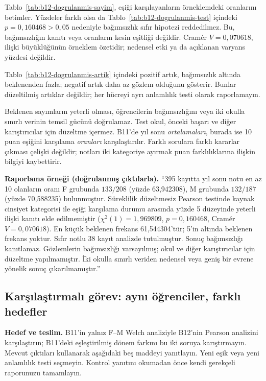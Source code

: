 \begin{outputguidebox}
Tablo~\ref{tab:b12-dogrulanmis-sayim}, eşiği karşılayanların
örneklemdeki oranlarını betimler. Yüzdeler farklı olsa da
Tablo~\ref{tab:b12-dogrulanmis-test} içindeki
$p=0{,}160468>0{,}05$ nedeniyle bağımsızlık sıfır hipotezi
reddedilmez. Bu, bağımsızlığın kanıtı veya oranların kesin eşitliği
değildir. Cramér $V=0{,}070618$, ilişki büyüklüğünün örneklem
özetidir; nedensel etki ya da açıklanan varyans yüzdesi değildir.

Tablo~\ref{tab:b12-dogrulanmis-artik} içindeki pozitif artık,
bağımsızlık altında beklenenden fazla; negatif artık daha az
gözlem olduğunu gösterir. Bunlar düzeltilmiş artıklar değildir;
her hücreyi ayrı anlamlılık testi olarak raporlamayın.

Beklenen sayımların yeterli olması, öğrencilerin bağımsızlığını
veya iki okulla sınırlı verinin temsil gücünü doğrulamaz. Test okul,
önceki başarı ve diğer karıştırıcılar için düzeltme içermez.
B11'de yıl sonu \emph{ortalamaları}, burada ise 10 puan eşiğini
karşılama \emph{oranları} karşılaştırılır. Farklı sorulara farklı
kararlar çıkması çelişki değildir; notları iki kategoriye ayırmak
puan farklılıklarına ilişkin bilgiyi kaybettirir.
\end{outputguidebox}

\textbf{Raporlama örneği (doğrulanmış çıktılarla).}
``395 kayıtta yıl sonu notu en az 10 olanların oranı F grubunda
$133/208$ (yüzde 63,942308), M grubunda $132/187$ (yüzde 70,588235)
bulunmuştur. Süreklilik düzeltmesiz Pearson testinde kaynak cinsiyet
kategorisi ile eşiği karşılama durumu arasında yüzde 5 düzeyinde
yeterli ilişki kanıtı elde edilmemiştir
($\chi^2(1)=1{,}969809$, $p=0{,}160468$, Cramér $V=0{,}070618$).
En küçük beklenen frekans 61,544304'tür; 5'in altında beklenen
frekans yoktur. Sıfır notlu 38 kayıt analizde tutulmuştur.
Sonuç bağımsızlığı kanıtlamaz. Gözlemlerin bağımsızlığı varsayılmış;
okul ve diğer karıştırıcılar için düzeltme yapılmamıştır. İki okulla
sınırlı veriden nedensel veya geniş bir evrene yönelik sonuç çıkarılmamıştır.''

\subsection{Karşılaştırmalı görev: aynı öğrenciler, farklı hedefler}
\label{sec:b12-karsilastirmali-gorev}

\textbf{Hedef ve teslim.} B11'in yalnız F--M Welch analiziyle B12'nin
Pearson analizini karşılaştırın; B11'deki eşleştirilmiş dönem farkını bu
iki soruya karıştırmayın. Mevcut çıktıları kullanarak aşağıdaki beş
maddeyi yanıtlayın. Yeni eşik veya yeni anlamlılık testi seçmeyin.
Kontrol yanıtını okumadan önce kendi gerekçeli raporunuzu tamamlayın.

